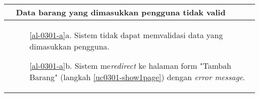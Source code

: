 \begin{table}[H]
\begin{tabular}{|r|p{8cm}|}
		\multicolumn{1}{|l|}{}                                           & \textbf{Data barang yang dimasukkan pengguna tidak valid}
			\\ \hline
		\multicolumn{1}{|l|}{}                                           & 
			 \begin{itemize}
			 	\item[\ref{al-0301-a}a.] Sistem tidak dapat memvalidasi data yang dimasukkan pengguna.
			 	\item[\ref{al-0301-a}b.] Sistem me\textit{redirect} ke halaman form "Tambah Barang" (langkah \ref{uc0301-show1page}) dengan \textit{error message}.
			 \end{itemize}
		 \\ \hline
	\end{tabular}
\end{table}
